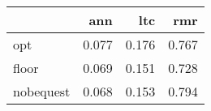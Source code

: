 \begin{tabular}{lrrr}
\toprule
{} &    ann &    ltc &    rmr \\
\midrule
opt       &  0.077 &  0.176 &  0.767 \\
floor     &  0.069 &  0.151 &  0.728 \\
nobequest &  0.068 &  0.153 &  0.794 \\
\bottomrule
\end{tabular}
